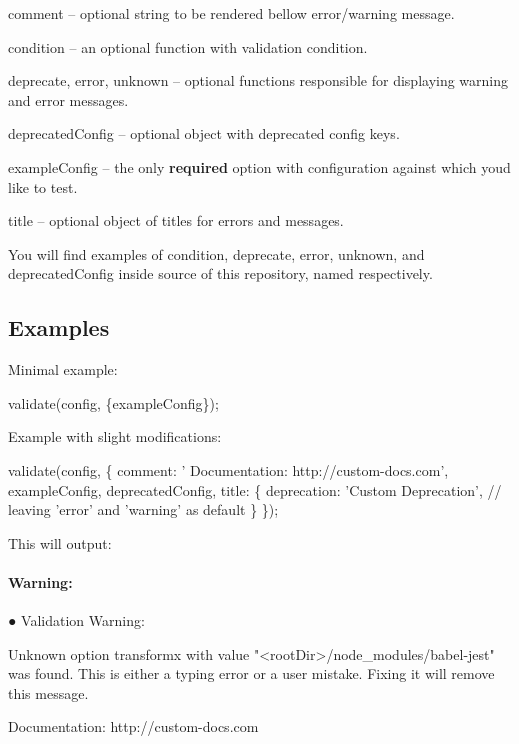 \begin{DoxyItemize}
\item {\ttfamily comment} – optional string to be rendered bellow error/warning message.
\item {\ttfamily condition} – an optional function with validation condition.
\item {\ttfamily deprecate}, {\ttfamily error}, {\ttfamily unknown} – optional functions responsible for displaying warning and error messages.
\item {\ttfamily deprecated\+Config} – optional object with deprecated config keys.
\item {\ttfamily example\+Config} – the only {\bfseries required} option with configuration against which you\textquotesingle{}d like to test.
\item {\ttfamily title} – optional object of titles for errors and messages.
\end{DoxyItemize}

You will find examples of {\ttfamily condition}, {\ttfamily deprecate}, {\ttfamily error}, {\ttfamily unknown}, and {\ttfamily deprecated\+Config} inside source of this repository, named respectively.

\subsection*{Examples}

Minimal example\+:


\begin{DoxyCode}
validate(config, \{exampleConfig\});
\end{DoxyCode}


Example with slight modifications\+:


\begin{DoxyCode}
validate(config, \{
  comment: '  Documentation: http://custom-docs.com',
  exampleConfig,
  deprecatedConfig,
  title: \{
    deprecation: 'Custom Deprecation',
    // leaving 'error' and 'warning' as default
  \}
\});
\end{DoxyCode}


This will output\+:

\paragraph*{Warning\+:}


\begin{DoxyCode}
● Validation Warning:

  Unknown option transformx with value "<rootDir>/node\_modules/babel-jest" was found.
  This is either a typing error or a user mistake. Fixing it will remove this message.

  Documentation: http://custom-docs.com
\end{DoxyCode}


